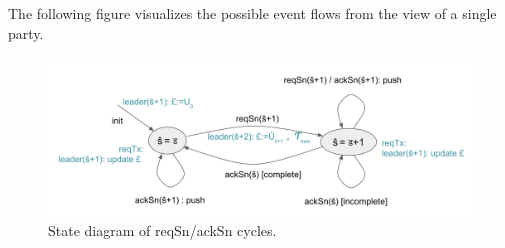 The following figure visualizes the possible event flows from the view of a single party.
\begin{figure}[ht]
  \centering
  \includegraphics[width=\linewidth*2/3]{fig/reqackstates.png}
                  \caption{State diagram of reqSn/ackSn cycles.}
                  \label{fig:sim:baselines}
\end{figure}

